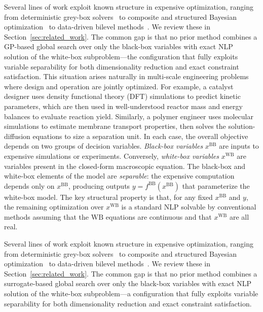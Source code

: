 \documentclass[12pt,a4paper]{article}%
\theoremstyle{plain}%
\theoremstyle{remark}%
\theoremstyle{definition}%
\def\WB{\mathrm{WB}}
\def\BB{\mathrm{BB}}
\begin{document}
Several lines of work exploit known structure in expensive optimization, ranging from deterministic grey-box solvers~\cite{boukouvala2017greybox_jgo,boukouvala2017argonaut,eason2016trf} to composite and structured Bayesian optimization~\cite{astudillo2019bocf,paulson2022cobalt,kudva2026bonsai} to data-driven bilevel methods~\cite{beykal2020domino,kieffer2017bilevel}. We review these in Section~\ref{sec:related_work}. The common gap is that no prior method combines a GP-based global search over only the black-box variables with exact NLP solution of the white-box subproblem---the configuration that fully exploits variable separability for both dimensionality reduction and exact constraint satisfaction.
This situation arises naturally in multi-scale engineering problems where design and operation are jointly optimized. For example, a catalyst designer uses density functional theory (DFT) simulations to predict kinetic parameters, which are then used in well-understood reactor mass and energy balances to evaluate reaction yield. Similarly, a polymer engineer uses molecular simulations to estimate membrane transport properties, then solves the solution-diffusion equations to size a separation unit. In each case, the overall objective depends on two groups of decision variables. \emph{Black-box variables} $x^{\BB}$ are inputs to expensive simulations or experiments. Conversely, \emph{white-box variables} $x^{\WB}$ are variables present in the closed-form macroscopic equation. The black-box and white-box elements of the model are \emph{separable}: the expensive computation depends only on $x^{\BB}$, producing outputs $y = f^{\BB}(x^{\BB})$ that parameterize the white-box model. The key structural property is that, for any fixed $x^{\BB}$ and $y$, the remaining optimization over $x^{\WB}$ is a standard NLP solvable by conventional methods assuming that the $\WB$ equations are continuous and that $x^{\WB}$ are all real.

Several lines of work exploit known structure in expensive optimization, ranging from deterministic grey-box solvers~\cite{boukouvala2017greybox_jgo,boukouvala2017argonaut,eason2016trf} to composite and structured Bayesian optimization~\cite{astudillo2019bocf,paulson2022cobalt,kudva2026bonsai} to data-driven bilevel methods~\cite{beykal2020domino,kieffer2017bilevel}. We review these in Section~\ref{sec:related_work}. The common gap is that no prior method combines a surrogate-based global search over only the black-box variables with exact NLP solution of the white-box subproblem---a configuration that fully exploits variable separability for both dimensionality reduction and exact constraint satisfaction.
\end{document}
